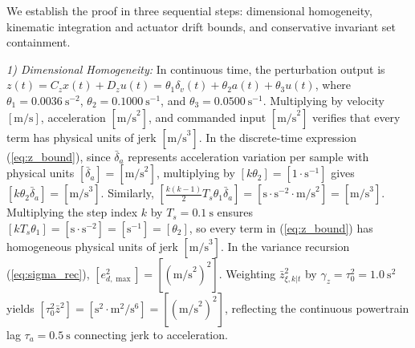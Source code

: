 \documentclass[journal]{IEEEtran}
\begin{document}
\begin{IEEEproof}
We establish the proof in three sequential steps: dimensional homogeneity, kinematic integration and actuator drift bounds, and conservative invariant set containment.

\emph{1) Dimensional Homogeneity:} In continuous time, the perturbation output is $z(t) = C_z x(t) + D_z u(t) = \theta_1 \delta_v(t) + \theta_2 a(t) + \theta_3 u(t)$, where $\theta_1 = 0.0036~\text{s}^{-2}$, $\theta_2 = 0.1000~\text{s}^{-1}$, and $\theta_3 = 0.0500~\text{s}^{-1}$. Multiplying by velocity $[\text{m/s}]$, acceleration $[\text{m/s}^2]$, and commanded input $[\text{m/s}^2]$ verifies that every term has physical units of jerk $[\text{m/s}^3]$. In the discrete-time expression (\ref{eq:z_bound}), since $\bar\delta_a$ represents acceleration variation per sample with physical units $[\bar\delta_a] = [\text{m/s}^2]$, multiplying by $[k \theta_2] = [1 \cdot \text{s}^{-1}]$ gives $[k \theta_2 \bar\delta_a] = [\text{m/s}^3]$. Similarly, $[\frac{k(k-1)}{2} T_s \theta_1 \bar\delta_a] = [\text{s} \cdot \text{s}^{-2} \cdot \text{m/s}^2] = [\text{m/s}^3]$. Multiplying the step index $k$ by $T_s = 0.1~\text{s}$ ensures $[k T_s \theta_1] = [\text{s}\cdot\text{s}^{-2}] = [\text{s}^{-1}] = [\theta_2]$, so every term in (\ref{eq:z_bound}) has homogeneous physical units of jerk $[\text{m/s}^3]$. In the variance recursion (\ref{eq:sigma_rec}), $[e_{d,\max}^2] = [(\text{m/s}^2)^2]$. Weighting $\bar z_{\xi,k|t}^2$ by $\gamma_z = \tau_0^2 = 1.0~\text{s}^2$ yields $[\tau_0^2 \bar z^2] = [\text{s}^2 \cdot \text{m}^2/\text{s}^6] = [(\text{m/s}^2)^2]$, reflecting the continuous powertrain lag $\tau_a = 0.5~\text{s}$ connecting jerk to acceleration.


\end{IEEEproof}
\end{document}
